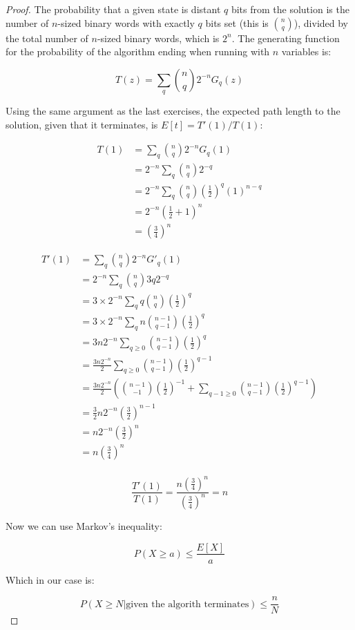\documentclass[10pt]{book}
\begin{document}
\begin{proof}
  The probability that a given state is distant $q$ bits from the solution is the number of $n$-sized binary words with exactly $q$ bits set (this is ${n\choose q}$), divided by the total number of $n$-sized binary words, which is $2^n$. The generating function for the probability of the algorithm ending when running with $n$ variables is:

$$ T(z)=\sum_q {n\choose q}2^{-n}G_q(z) $$

Using the same argument as the last exercises, the expected path length to the solution, given that it terminates, is $E[t] = T'(1)/T(1)$:

\begin{align*}
  T(1) &= \sum_q {n\choose q}2^{-n}G_q(1) \\
       &= 2^{-n} \sum_q {n\choose q}2^{-q} \\
       &= 2^{-n} \sum_q {n\choose q}\left(\frac{1}{2}\right)^{q}\left(1\right)^{n-q} \\
    &= 2^{-n}\left(\frac{1}{2}+1\right)^n \\
    &= \left(\frac{3}{4}\right)^n
\end{align*}

\begin{align*}
  T'(1) &= \sum_q {n\choose q}2^{-n}G'_q(1) \\
  &= 2^{-n} \sum_q {n\choose q}3q 2^{-q} \\
  &= 3\times 2^{-n} \sum_q q{n\choose q}\left(\frac{1}{2}\right)^{q} \\
  &= 3\times 2^{-n} \sum_q n{n-1\choose q-1}\left(\frac{1}{2}\right)^{q} \\
  &= 3n2^{-n} \sum_{q\ge 0} {n-1\choose q-1}\left(\frac{1}{2}\right)^{q} \\
  &= \frac{3n2^{-n}}{2} \sum_{q\ge 0} {n-1\choose q-1}\left(\frac{1}{2}\right)^{q-1} \\
  &= \frac{3n2^{-n}}{2} \left({n-1\choose -1}\left(\frac{1}{2}\right)^{-1}+
\sum_{q-1\ge 0} {n-1\choose q-1}\left(\frac{1}{2}\right)^{q-1}\right) \\
  &= \frac{3}{2}n2^{-n}\left(\frac{3}{2}\right)^{n-1}  \\
  &= n2^{-n}\left(\frac{3}{2}\right)^{n}  \\
  &= n\left(\frac{3}{4}\right)^{n}  \\
\end{align*}

$$  \frac{T'(1)}{T(1)} = \frac{n\left(\frac{3}{4}\right)^n}
  {\left(\frac{3}{4}\right)^n} 
  = n$$

Now we can use Markov's inequality:

$$P(X\ge a) \le \frac{E[X]}{a}$$

Which in our case is:

$$P(X\ge N|\text{given the algorith terminates}) \le \frac{n}{N}$$

\end{proof}
\end{document}
